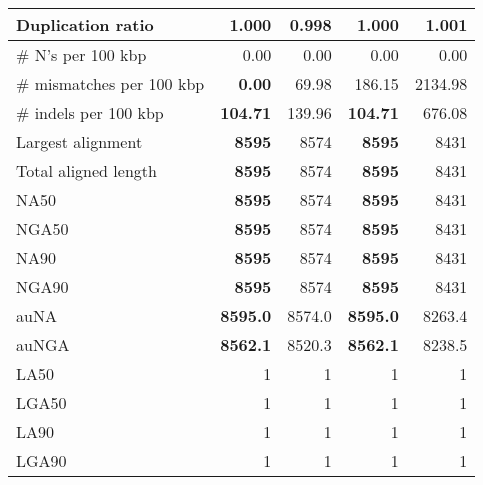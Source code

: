 \documentclass[12pt,a4paper]{article}
\begin{document}
\begin{table}[ht]
\begin{center}
\begin{tabular}{|l*{4}{|r}|}
Duplication ratio & 1.000 & {\bf 0.998} & 1.000 & 1.001 \\ \hline
\# N's per 100 kbp & 0.00 & 0.00 & 0.00 & 0.00 \\ \hline
\# mismatches per 100 kbp & {\bf 0.00} & 69.98 & 186.15 & 2134.98 \\ \hline
\# indels per 100 kbp & {\bf 104.71} & 139.96 & {\bf 104.71} & 676.08 \\ \hline
Largest alignment & {\bf 8595} & 8574 & {\bf 8595} & 8431 \\ \hline
Total aligned length & {\bf 8595} & 8574 & {\bf 8595} & 8431 \\ \hline
NA50 & {\bf 8595} & 8574 & {\bf 8595} & 8431 \\ \hline
NGA50 & {\bf 8595} & 8574 & {\bf 8595} & 8431 \\ \hline
NA90 & {\bf 8595} & 8574 & {\bf 8595} & 8431 \\ \hline
NGA90 & {\bf 8595} & 8574 & {\bf 8595} & 8431 \\ \hline
auNA & {\bf 8595.0} & 8574.0 & {\bf 8595.0} & 8263.4 \\ \hline
auNGA & {\bf 8562.1} & 8520.3 & {\bf 8562.1} & 8238.5 \\ \hline
LA50 & 1 & 1 & 1 & 1 \\ \hline
LGA50 & 1 & 1 & 1 & 1 \\ \hline
LA90 & 1 & 1 & 1 & 1 \\ \hline
LGA90 & 1 & 1 & 1 & 1 \\ \hline
\end{tabular}
\end{center}
\end{table}
\end{document}
